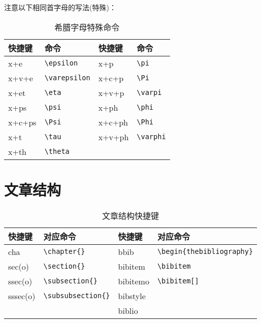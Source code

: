 \documentclass[blue,cn,normal,11pt]{elegantnote}
\begin{document}
注意以下相同首字母的写法(特殊)：

\begin{table}[htbp]
  \centering
  \caption{希腊字母特殊命令}
    \begin{tabular}{llll}
    \toprule
    快捷键   & 命令    & 快捷键 & 命令 \\
    \midrule
    x+e   & \lstinline|\epsilon| & x+p & \lstinline|\pi| \\
    x+v+e & \lstinline|\varepsilon| & x+c+p & \lstinline|\Pi| \\
    x+et  & \lstinline|\eta| & x+v+p & \lstinline|\varpi| \\
    x+ps  & \lstinline|\psi| & x+ph & \lstinline|\phi| \\
    x+c+ps & \lstinline|\Psi| & x+c+ph & \lstinline|\Phi| \\
    x+t   & \lstinline|\tau| & x+v+ph & \lstinline|\varphi| \\
    x+th  & \lstinline|\theta| &       &  \\
    \bottomrule
    \end{tabular}%
  \label{tab:greek}%
\end{table}%


\section{文章结构}

\begin{table}[htbp]
  \centering
  \caption{文章结构快捷键}
    \begin{tabular}{llll}
    \toprule
    快捷键& 对应命令 & 快捷键 & 对应命令 \\
    \midrule
    cha     & \lstinline|\chapter{}| & bbib    & \lstinline|\begin{thebibliography}| \\
    sec(o) 	& \lstinline|\section{}|    & bibitem    & \lstinline|\bibitem| \\
    ssec(o) & \lstinline|\subsection{}| & bibitemo   & \lstinline|\bibitem[]| \\
    sssec(o)& \lstinline|\subsubsection{}| & bibstyle  & \lstinline|| \\
          &       & biblio     & \lstinline|| \\
    \bottomrule
    \end{tabular}%
  \label{tab:structural}%
\end{table}%
\end{document}
